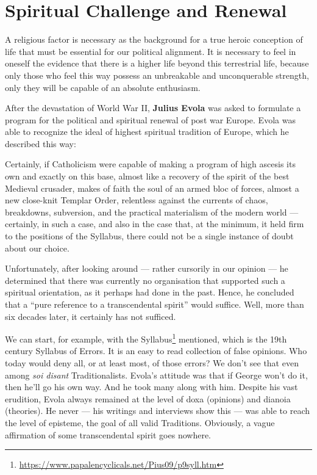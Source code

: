 \section{Spiritual Challenge and Renewal}

\begin{quotationx}
A religious factor is necessary as the background for a true heroic conception of life that must be essential for our
political alignment. It is necessary to feel in oneself the evidence that there is a higher life beyond this
terrestrial life, because only those who feel this way possess an unbreakable and unconquerable strength, only they
will be capable of an absolute enthusiasm.  

\end{quotationx}
After the devastation of World War II, \textbf{Julius Evola} was asked to formulate a program for the political and
spiritual renewal of post war Europe. Evola was able to recognize the ideal of highest spiritual tradition of Europe,
which he described this way:

\begin{quotationx}
Certainly, if Catholicism were capable of making a program of high ascesis its own and exactly on this base, almost like
a recovery of the spirit of the best Medieval crusader, makes of faith the soul of an armed bloc of forces, almost a
new close-knit Templar Order, relentless against the currents of chaos, breakdowns, subversion, and the practical
materialism of the modern world — certainly, in such a case, and also in the case that, at the minimum, it
held firm to the positions of the Syllabus, there could not be a single instance of doubt about our choice.  

\end{quotationx}
Unfortunately, after looking around — rather cursorily in our opinion — he determined that there
was currently no organisation that supported such a spiritual orientation, as it perhaps had done in the past. Hence,
he concluded that a “pure reference to a transcendental spirit” would suffice. Well, more than six decades later, it
certainly has not sufficed.

We can start, for example, with the Syllabus\footnote{\url{https://www.papalencyclicals.net/Pius09/p9syll.htm}} mentioned, which is the 19th century Syllabus of Errors. It is an easy to
read collection of false opinions. Who today would deny all, or at least most, of those errors? We don't
see that even among \emph{soi disant} Traditionalists. Evola's attitude was that if George
won't do it, then he'll go his own way. And he took many along with him. Despite his vast
erudition, Evola always remained at the level of doxa (opinions) and dianoia (theories). He never — his
writings and interviews show this — was able to reach the level of episteme, the goal of all valid
Traditions. Obviously, a vague affirmation of some transcendental spirit goes nowhere.

